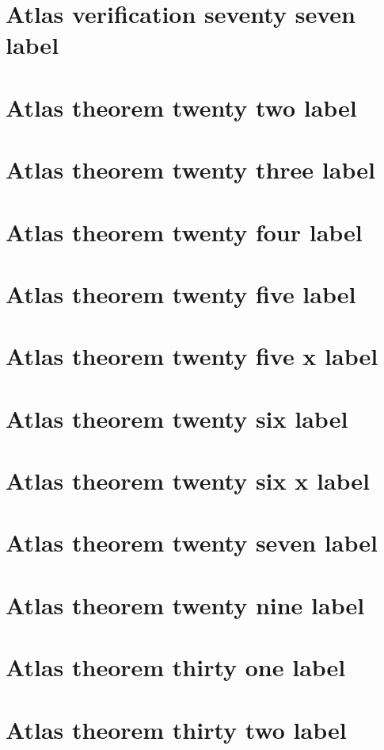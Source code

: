\documentclass[11pt]{article}
\theoremstyle{definition}
\begin{document}
\section{Atlas verification seventy seven label}
\label{ll:labels:atlas-v77}
\section{Atlas theorem twenty two label}
\label{ll:labels:atlas-t22}
\section{Atlas theorem twenty three label}
\label{ll:labels:atlas-t23}
\section{Atlas theorem twenty four label}
\label{ll:labels:atlas-t24}
\section{Atlas theorem twenty five label}
\label{ll:labels:atlas-t25}
\section{Atlas theorem twenty five x label}
\label{ll:labels:atlas-t25x}
\section{Atlas theorem twenty six label}
\label{ll:labels:atlas-t26}
\section{Atlas theorem twenty six x label}
\label{ll:labels:atlas-t26x}
\section{Atlas theorem twenty seven label}
\label{ll:labels:atlas-t27}
\section{Atlas theorem twenty nine label}
\label{ll:labels:atlas-t29}
\section{Atlas theorem thirty one label}
\label{ll:labels:atlas-t31}
\section{Atlas theorem thirty two label}
\label{ll:labels:atlas-t32}
\end{document}

